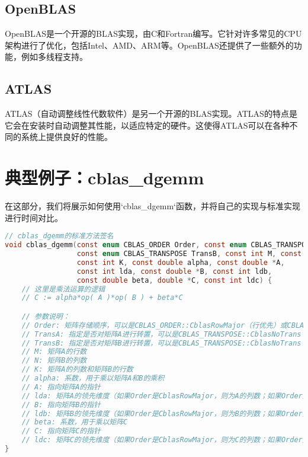 \documentclass{ctexart}
\begin{document}
\subsection{OpenBLAS}
OpenBLAS是一个开源的BLAS实现，由C和Fortran编写。它针对许多常见的CPU架构进行了优化，包括Intel、AMD、ARM等。OpenBLAS还提供了一些额外的功能，例如多线程支持。

\subsection{ATLAS}
ATLAS（自动调整线性代数软件）是另一个开源的BLAS实现。ATLAS的特点是它会在安装时自动调整其性能，以适应特定的硬件。这使得ATLAS可以在各种不同的系统上提供良好的性能。

\section{典型例子：cblas\_dgemm}
在这部分，我们将展示如何使用`cblas\_dgemm`函数，并将自己的实现与标准实现进行时间对比。

\begin{lstlisting}[language=C, breaklines=true]
// cblas_dgemm的标准方法签名
void cblas_dgemm(const enum CBLAS_ORDER Order, const enum CBLAS_TRANSPOSE TransA,
                 const enum CBLAS_TRANSPOSE TransB, const int M, const int N,
                 const int K, const double alpha, const double *A,
                 const int lda, const double *B, const int ldb,
                 const double beta, double *C, const int ldc) {
    // 这里是乘法运算的逻辑
    // C := alpha*op( A )*op( B ) + beta*C

    // 参数说明：
    // Order: 矩阵存储顺序，可以是CBLAS_ORDER::CblasRowMajor（行优先）或CBLAS_ORDER::CblasColMajor（列优先）
    // TransA: 指定是否对矩阵A进行转置，可以是CBLAS_TRANSPOSE::CblasNoTrans（不转置）或CBLAS_TRANSPOSE::CblasTrans（转置）
    // TransB: 指定是否对矩阵B进行转置，可以是CBLAS_TRANSPOSE::CblasNoTrans（不转置）或CBLAS_TRANSPOSE::CblasTrans（转置）
    // M: 矩阵A的行数
    // N: 矩阵B的列数
    // K: 矩阵A的列数和矩阵B的行数
    // alpha: 系数，用于乘以矩阵A和B的乘积
    // A: 指向矩阵A的指针
    // lda: 矩阵A的领先维度（如果Order是CblasRowMajor，则为A的列数；如果Order是CblasColMajor，则为A的行数）
    // B: 指向矩阵B的指针
    // ldb: 矩阵B的领先维度（如果Order是CblasRowMajor，则为B的列数；如果Order是CblasColMajor，则为B的行数）
    // beta: 系数，用于乘以矩阵C
    // C: 指向矩阵C的指针
    // ldc: 矩阵C的领先维度（如果Order是CblasRowMajor，则为C的列数；如果Order是CblasColMajor，则为C的行数）
}
\end{lstlisting}
\end{document}

